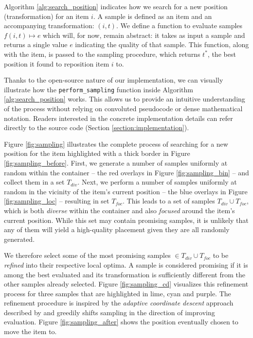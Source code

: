 \documentclass[preprint, 11pt, authoryear]{elsarticle}
\begin{document}



Algorithm \ref{alg:search_position} indicates how we search for a new position (transformation) for an item $i$.
A sample is defined as an item and an accompanying transformation: $(i, t)$.
We define a function to evaluate samples $f(i,t) \mapsto e$ which will, for now, remain abstract: it takes as input a sample and returns a single value $e$ indicating the quality of that sample.
This function, along with the item, is passed to the sampling procedure, which returns $t^*$, the best position it found to reposition item $i$ to.

Thanks to the open-source nature of our implementation, we can visually illustrate how the \texttt{perform\_sampling} function inside Algorithm \ref{alg:search_position} works.
This allows us to provide an intuitive understanding of the process without relying on convoluted pseudocode or dense mathematical notation.
Readers interested in the concrete implementation details can refer directly to the source code (Section \ref{section:implementation}).



Figure \ref{fig:sampling} illustrates the complete process of searching for a new position for the item highlighted with a thick border in Figure \ref{fig:sampling_before}.
First, we generate a number of samples uniformly at random within the container -- the red overlays in Figure \ref{fig:sampling_bin} -- and collect them in a set $T_{div}$.
Next, we perform a number of samples uniformly at random in the vicinity of the item's current position -- the blue overlays in Figure \ref{fig:sampling_loc} -- resulting in set $T_{foc}$.
This leads to a set of samples $T_{div} \cup T_{foc}$, which is both \emph{diverse} within the container and also \emph{focused} around the item's current position.
While this set may contain promising samples, it is unlikely that any of them will yield a high-quality placement given they are all randomly generated.

We therefore select some of the most promising samples $\in T_{div} \cup T_{foc}$ to be \emph{refined} into their respective local optima.
A sample is considered promising if it is among the best evaluated and its transformation is sufficiently different from the other samples already selected.
Figure \ref{fig:sampling_cd} visualizes this refinement process for three samples that are highlighted in lime, cyan and purple.
The refinement procedure is inspired by the \emph{adaptive coordinate descent} approach described by \citet{loshchilov2011adaptive} and greedily shifts sampling in the direction of improving evaluation.
Figure \ref{fig:sampling_after} shows the position eventually chosen to move the item to.
\end{document}
